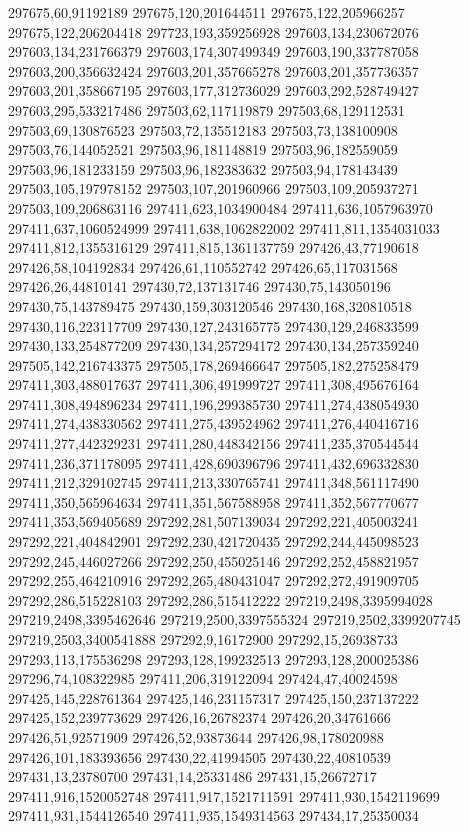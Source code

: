 297675,60,91192189
297675,120,201644511
297675,122,205966257
297675,122,206204418
297723,193,359256928
297603,134,230672076
297603,134,231766379
297603,174,307499349
297603,190,337787058
297603,200,356632424
297603,201,357665278
297603,201,357736357
297603,201,358667195
297603,177,312736029
297603,292,528749427
297603,295,533217486
297503,62,117119879
297503,68,129112531
297503,69,130876523
297503,72,135512183
297503,73,138100908
297503,76,144052521
297503,96,181148819
297503,96,182559059
297503,96,181233159
297503,96,182383632
297503,94,178143439
297503,105,197978152
297503,107,201960966
297503,109,205937271
297503,109,206863116
297411,623,1034900484
297411,636,1057963970
297411,637,1060524999
297411,638,1062822002
297411,811,1354031033
297411,812,1355316129
297411,815,1361137759
297426,43,77190618
297426,58,104192834
297426,61,110552742
297426,65,117031568
297426,26,44810141
297430,72,137131746
297430,75,143050196
297430,75,143789475
297430,159,303120546
297430,168,320810518
297430,116,223117709
297430,127,243165775
297430,129,246833599
297430,133,254877209
297430,134,257294172
297430,134,257359240
297505,142,216743375
297505,178,269466647
297505,182,275258479
297411,303,488017637
297411,306,491999727
297411,308,495676164
297411,308,494896234
297411,196,299385730
297411,274,438054930
297411,274,438330562
297411,275,439524962
297411,276,440416716
297411,277,442329231
297411,280,448342156
297411,235,370544544
297411,236,371178095
297411,428,690396796
297411,432,696332830
297411,212,329102745
297411,213,330765741
297411,348,561117490
297411,350,565964634
297411,351,567588958
297411,352,567770677
297411,353,569405689
297292,281,507139034
297292,221,405003241
297292,221,404842901
297292,230,421720435
297292,244,445098523
297292,245,446027266
297292,250,455025146
297292,252,458821957
297292,255,464210916
297292,265,480431047
297292,272,491909705
297292,286,515228103
297292,286,515412222
297219,2498,3395994028
297219,2498,3395462646
297219,2500,3397555324
297219,2502,3399207745
297219,2503,3400541888
297292,9,16172900
297292,15,26938733
297293,113,175536298
297293,128,199232513
297293,128,200025386
297296,74,108322985
297411,206,319122094
297424,47,40024598
297425,145,228761364
297425,146,231157317
297425,150,237137222
297425,152,239773629
297426,16,26782374
297426,20,34761666
297426,51,92571909
297426,52,93873644
297426,98,178020988
297426,101,183393656
297430,22,41994505
297430,22,40810539
297431,13,23780700
297431,14,25331486
297431,15,26672717
297411,916,1520052748
297411,917,1521711591
297411,930,1542119699
297411,931,1544126540
297411,935,1549314563
297434,17,25350034
